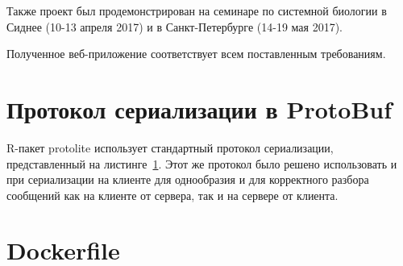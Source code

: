 \documentclass[annotation,specification]{itmo-student-thesis}
\begin{document}
Также проект был продемонстрирован на семинаре по системной биологии в Сиднее (10-13 апреля 2017) и в Санкт-Петербурге (14-19 мая 2017).

Полученное веб-приложение соответствует всем поставленным требованиям. 
\printmainbibliography

\appendix
\chapter{Протокол сериализации в ProtoBuf}\label{proto}
R-пакет protolite использует стандартный протокол сериализации, представленный на листинге~\ref{proto}. Этот же протокол было решено использовать и при сериализации на клиенте для однообразия и для корректного разбора сообщений как на клиенте от сервера, так и на сервере от клиента.

\chapter{Dockerfile}\label{dockerfile}

\end{document}
